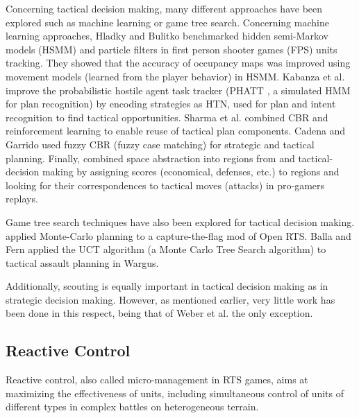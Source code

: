 \documentclass[journal]{IEEEtran}
\begin{document}
Concerning tactical decision making, many different approaches have been explored such as machine learning or game tree search. Concerning machine learning approaches, 
Hladky and Bulitko \cite{Hladky2008} benchmarked hidden semi-Markov models (HSMM) and particle filters in first person shooter games (FPS) units tracking. They showed that the accuracy of occupancy maps was improved using movement models (learned from the player behavior) in HSMM. Kabanza et al. \cite{OBRecog} improve the probabilistic hostile agent task tracker (PHATT \cite{PHATT}, a simulated HMM for plan recognition) by encoding strategies as HTN, used for plan and intent recognition to find tactical opportunities. Sharma et al. \cite{CBR-RL} combined CBR and reinforcement learning to enable reuse of tactical plan components. Cadena and Garrido \cite{CadenaG11} used fuzzy CBR (fuzzy case matching) for strategic and tactical planning. Finally, \cite{SynnaeveTactics} combined space abstraction into regions from \cite{Perkins10} and tactical-decision making by assigning scores (economical, defenses, etc.) to regions and looking for their correspondences to tactical moves (attacks) in pro-gamers replays.


Game tree search techniques have also been explored for tactical decision making. \cite{Chung05} applied Monte-Carlo planning to a capture-the-flag mod of Open RTS. Balla and Fern \cite{UCT} applied the UCT algorithm (a Monte Carlo Tree Search algorithm) to tactical assault planning in Wargus. %

Additionally, scouting is equally important in tactical decision making as in strategic decision making. However, as mentioned earlier, very little work has been done in this respect, being that of Weber et al. \cite{WeberAIIDE11} the only exception.


\subsection{Reactive Control}

Reactive control, also called micro-management in RTS games, aims at maximizing the effectiveness of units, including simultaneous control of units of different types in complex battles on heterogeneous terrain. 
\end{document}
